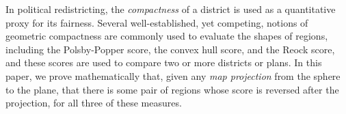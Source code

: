 In political redistricting, the \textit{compactness} of a district is
used as a quantitative proxy for its fairness.  Several
well-established, yet competing, notions of geometric compactness are
commonly used to evaluate the shapes of regions, including the
Polsby-Popper score, the convex hull score, and the Reock score, and
these scores are used to compare two or more districts or plans.  In
this paper, we prove mathematically that, given any \textit{map
projection} from the sphere to the plane, that there is some pair of
regions whose score is reversed after the projection, for all three of
these measures.   
